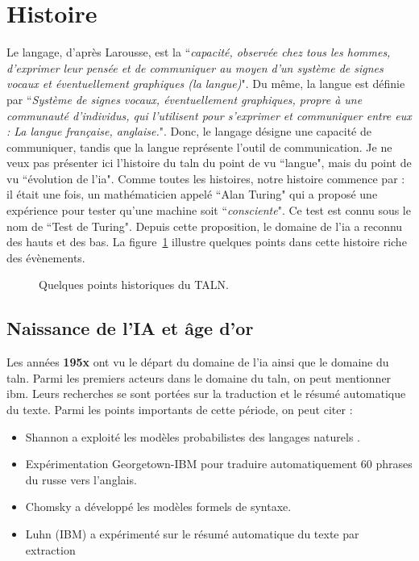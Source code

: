 \documentclass{KodeBook}
\begin{document}
\section{Histoire}

Le langage, d'après Larousse, est la ``\textit{capacité, observée chez tous les hommes, d'exprimer leur pensée et de communiquer au moyen d'un système de signes vocaux et éventuellement graphiques (la langue)}".
Du même, la langue est définie par ``\textit{Système de signes vocaux, éventuellement graphiques, propre à une communauté d'individus, qui l'utilisent pour s'exprimer et communiquer entre eux : La langue française, anglaise.}". 
Donc, le langage désigne une capacité de communiquer, tandis que la langue représente l'outil de communication. 
Je ne veux pas présenter ici l'histoire du \ac{taln} du point de vu ``langue", mais du point de vu ``évolution de l'\ac{ia}".
Comme toutes les histoires, notre histoire commence par : il était une fois, un mathématicien appelé ``Alan Turing" qui a proposé une expérience pour tester qu'une machine soit ``\textit{consciente}". 
Ce test est connu sous le nom de ``Test de Turing". 
Depuis cette proposition, le domaine de l'\ac{ia} a reconnu des hauts et des bas.
La figure~\ref{fig:histoire} illustre quelques points dans cette histoire riche des évènements.

\begin{figure}[!ht]
	\centering
	\caption{Quelques points historiques du TALN. \label{fig:histoire}}
\end{figure}

\subsection{Naissance de l'IA et âge d'or}

Les années \textbf{195x} ont vu le départ du domaine de  l'\ac{ia} ainsi que le domaine du \ac{taln}.
Parmi les premiers acteurs dans le domaine du \ac{taln}, on peut mentionner \ac{ibm}. 
Leurs recherches se sont portées sur la traduction et le résumé automatique du texte.
Parmi les points importants de cette période, on peut citer :
\begin{itemize}
	\item {} Shannon a exploité les modèles probabilistes des langages naturels \cite{1951-shannon}.
	\item {} Expérimentation Georgetown-IBM pour traduire automatiquement 60 phrases du russe vers l'anglais.
	\item {} Chomsky a développé les modèles formels de syntaxe.
	\item {} Luhn (IBM) a expérimenté sur le résumé automatique du texte par extraction \cite{1958-luhn}
\end{itemize}
\end{document}
